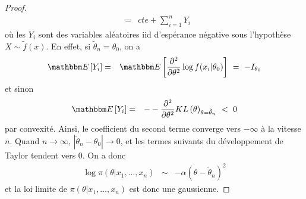\begin{proof}
\begin{eqnarray*}
& = & cte + \sum\limits_{i=1}^n Y_i
\end{eqnarray*}
où les $Y_i$ sont des variables aléatoires iid d'espérance négative sous l'hypothèse $X\sim \tilde{f}(x)$. En effet,  si $\tilde{\theta}_n=\theta_0$, on a 
\begin{eqnarray*}
\E\left[Y_i\right] & = & \E\left[\frac{\partial^2}{\partial \theta^2} \log f(x_i|\theta_0)\right] \ = \ - I_{\theta_0}
\end{eqnarray*}
et sinon
\begin{eqnarray*}
\E\left[Y_i\right] & = & - -\frac{\partial^2}{\partial \theta^2} KL\left(\theta\right)_{\theta=\tilde{\theta}_n} \ < \ 0 
\end{eqnarray*}
par convexité. Ainsi, le coefficient du second terme converge vers $-\infty$ à la vitesse $n$. Quand $n\to\infty$, $|\tilde{\theta}_n-\theta_0|\to 0$, et les termes suivants du développement de Taylor tendent vers 0. On a donc
\begin{eqnarray*}
\log \pi(\theta|x_1,\ldots,x_n) & \sim & -\alpha (\theta-\tilde{\theta}_n)^2
\end{eqnarray*}
et la loi limite de $\pi(\theta|x_1,\ldots,x_n)$ est donc une gaussienne.
\end{proof}